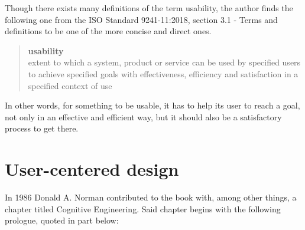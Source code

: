 
Though there exists many definitions of the term usability, the author finds the
following one from the ISO Standard 9241-11:2018\cite{citeISO9241}, section 3.1
- Terms and definitions to be one of the more concise and direct ones.
\begin{quote}
  \textbf{usability} \\
  extent to which a system, product or service can be used by specified users to
  achieve specified goals with effectiveness, efficiency and satisfaction in a
  specified context of use
\end{quote}

In other words, for something to be usable, it has to help its user to
reach a goal, not only in an effective and efficient way, but it should also be
a satisfactory process to get there.

%
%


\section{User-centered design}


In 1986 Donald A. Norman contributed to the book
\cite{citeUserCenteredNorman} with, among
other things, a chapter titled Cognitive Engineering\cite[p.
31]{citeUserCenteredNorman}. Said chapter begins with the following prologue,
quoted in part below:

